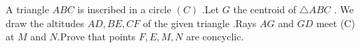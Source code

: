 A triangle $ABC$ is inscribed in a circle $(C)$ .Let $G$ the centroid  of $\triangle ABC$ .
We draw   the altitudes $AD,BE,CF$ of the given triangle .Rays $AG$ and $GD$ meet (C) at $M$ and $N$.Prove that points $ F,E,M,N $ are concyclic.